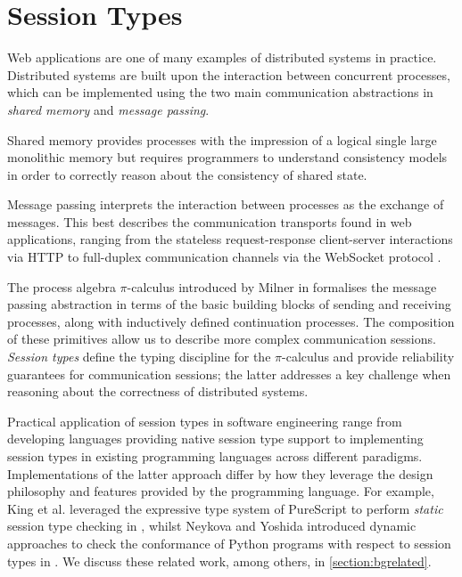\section{Session Types}
\label{section:sessiontypes}

Web applications are one of many examples of 
distributed systems in practice. 
Distributed systems are built upon the interaction 
between concurrent processes, which can be implemented using 
the two main communication abstractions in 
\textit{shared memory} and \textit{message passing}. 

Shared memory provides processes with the impression of 
a logical single large monolithic memory 
but requires programmers to understand consistency models 
in order to correctly reason about the consistency of shared state.

Message passing interprets the interaction between processes 
as the exchange of messages.
This best describes the communication transports 
found in web applications, ranging from the 
stateless request-response client-server interactions via HTTP 
to full-duplex communication channels via the WebSocket protocol 
\cite{WebSocketRFC}.

The process algebra $\pi$-calculus 
introduced by Milner in \cite{Milner1999} 
formalises the message passing abstraction in terms of 
the basic building blocks of sending and receiving processes,
along with inductively defined continuation processes. 
The composition of these primitives allow us to 
describe more complex communication sessions.
\textit{Session types} define the typing discipline 
for the $\pi$-calculus and provide reliability guarantees 
for communication sessions; 
the latter addresses a key challenge when 
reasoning about the correctness of distributed systems. 

Practical application of session types in software
engineering range from
developing languages providing native session type support 
\cite{ATS2016} to implementing session types 
in existing programming languages across different paradigms.
Implementations of the latter approach differ by 
how they leverage the design philosophy and features 
provided by the programming language.
For example, King et al. leveraged the 
expressive type system of PureScript to perform 
\textit{static} session type checking in \cite{PureScript2019},
whilst Neykova and Yoshida introduced dynamic approaches to 
check the conformance of Python programs 
with respect to session types in \cite{Python2017}.
We discuss these related work, among others, in \cref{section:bgrelated}.

